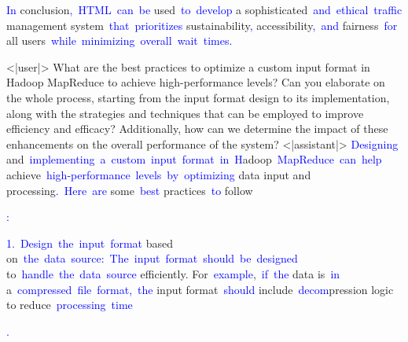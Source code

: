 \documentclass{article}
\begin{document}
\begin{tcolorbox}[colframe=black,colback=white]
\textcolor{blue}{In} conclusion\textcolor{blue}{,}\textcolor{blue}{~HTML}\textcolor{blue}{~can}\textcolor{blue}{~be} used\textcolor{blue}{~to}\textcolor{blue}{~develop} a sophisticated\textcolor{blue}{~and}\textcolor{blue}{~ethical}\textcolor{blue}{~traffic} management system\textcolor{blue}{~that}\textcolor{blue}{~priorit}\textcolor{blue}{izes} sustainability\textcolor{blue}{,} accessibility\textcolor{blue}{,}\textcolor{blue}{~and} fairness\textcolor{blue}{~for} all users\textcolor{blue}{~while}\textcolor{blue}{~minimizing}\textcolor{blue}{~overall}\textcolor{blue}{~wait}\textcolor{blue}{~times}\textcolor{blue}{.}\textcolor{blue}{}
\end{tcolorbox}


\begin{tcolorbox}[colframe=black,colback=white]
<|user|>
What are the best practices to optimize a custom input format in Hadoop MapReduce to achieve high-performance levels? Can you elaborate on the whole process, starting from the input format design to its implementation, along with the strategies and techniques that can be employed to improve efficiency and efficacy? Additionally, how can we determine the impact of these enhancements on the overall performance of the system?
<|assistant|>
\textcolor{blue}{Design}\textcolor{blue}{ing} and\textcolor{blue}{~implementing}\textcolor{blue}{~a}\textcolor{blue}{~custom}\textcolor{blue}{~input}\textcolor{blue}{~format}\textcolor{blue}{~in}\textcolor{blue}{~H}adoop\textcolor{blue}{~Map}\textcolor{blue}{Reduce}\textcolor{blue}{~can}\textcolor{blue}{~help} achieve\textcolor{blue}{~high}\textcolor{blue}{-performance}\textcolor{blue}{~levels}\textcolor{blue}{~by}\textcolor{blue}{~optimizing} data input and processing\textcolor{blue}{.}\textcolor{blue}{~Here}\textcolor{blue}{~are} some\textcolor{blue}{~best} practices\textcolor{blue}{~to} follow\textcolor{blue}{:

}\textcolor{blue}{1}\textcolor{blue}{.}\textcolor{blue}{~Design}\textcolor{blue}{~the}\textcolor{blue}{~input}\textcolor{blue}{~format} based on\textcolor{blue}{~the}\textcolor{blue}{~data}\textcolor{blue}{~source}\textcolor{blue}{:}\textcolor{blue}{~The}\textcolor{blue}{~input}\textcolor{blue}{~format}\textcolor{blue}{~should}\textcolor{blue}{~be}\textcolor{blue}{~designed} to\textcolor{blue}{~handle}\textcolor{blue}{~the}\textcolor{blue}{~data}\textcolor{blue}{~source} efficiently. For\textcolor{blue}{~example},\textcolor{blue}{~if}\textcolor{blue}{~the} data is\textcolor{blue}{~in} a\textcolor{blue}{~compressed}\textcolor{blue}{~file}\textcolor{blue}{~format}\textcolor{blue}{,}\textcolor{blue}{~the} input format\textcolor{blue}{~should} include\textcolor{blue}{~decom}pression logic to reduce\textcolor{blue}{~processing}\textcolor{blue}{~time}\textcolor{blue}{.

}
\end{tcolorbox}
\end{document}
